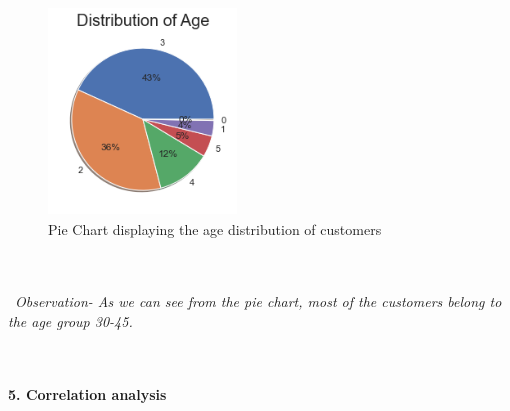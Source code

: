 \documentclass[a4paper, 10pt, conference]{ieeeconf}      %
\begin{document}
\\\
\begin{figure}[htp]
    \centering
    \includegraphics[width=5cm,height=5.5cm]{Images/distributionOfAge.png}
    \caption{Pie Chart displaying the age distribution of customers}
    \label{fig:distributionOfAge}
\end{figure}
\\\
\\\
\textit{Observation- As we can see from the pie chart, most of the customers belong to the age group 30-45.}

\\\
\\\textbf{5. Correlation analysis}
\end{document}
